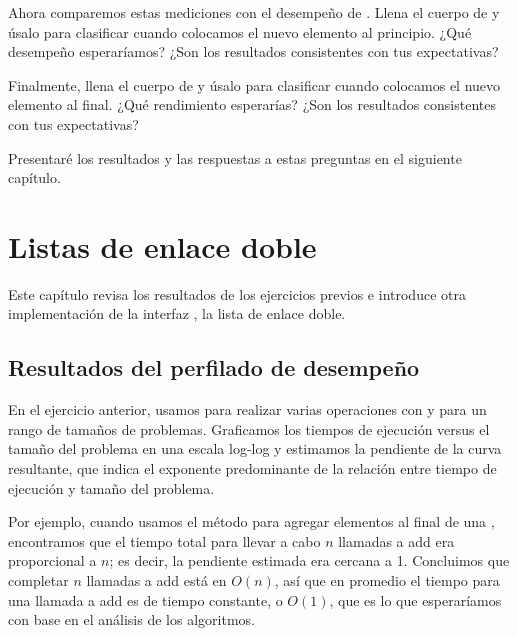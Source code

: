 \documentclass[12pt]{book}
\theoremstyle{exercise}
\begin{document}

Ahora comparemos estas mediciones con el desempeño de . Llena
el cuerpo de  y úsalo para clasificar
 cuando colocamos el nuevo elemento al principio. ¿Qué
desempeño esperaríamos? ¿Son los resultados consistentes con tus expectativas?


Finalmente, llena el cuerpo de  y úsalo
para clasificar  cuando colocamos el nuevo elemento al
final. ¿Qué rendimiento esperarías? ¿Son los resultados consistentes con
tus expectativas?

Presentaré los resultados y las respuestas a estas preguntas en el siguiente capítulo.


\chapter{Listas de enlace doble}

Este capítulo revisa los resultados de los ejercicios previos e introduce
otra implementación de la interfaz , la lista de enlace doble.

\section{Resultados del perfilado de desempeño}
\label{performance-profiling-results}


En el ejercicio anterior, usamos  para realizar varias
operaciones con  y  para un rango de
tamaños de problemas. Graficamos los tiempos de ejecución versus el tamaño
del problema en una escala log-log y estimamos la pendiente de la curva
resultante, que indica el exponente predominante de la relación entre tiempo
de ejecución y tamaño del problema.


Por ejemplo, cuando usamos el método  para agregar elementos
al final de una , encontramos que el tiempo total para llevar a
cabo $n$ llamadas a add era proporcional a $n$; es decir, la pendiente
estimada era cercana a 1. Concluimos que completar $n$ llamadas a add
está en $O(n)$, así que en promedio el tiempo para una llamada a add es de
tiempo constante, o $O(1)$, que es lo que esperaríamos con base en el análisis
de los algoritmos.
\end{document}
